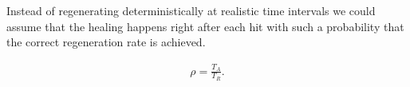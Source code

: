 %
%
%
%

Instead of regenerating deterministically at realistic time intervals we could assume that the healing happens right after each hit with such a probability that the correct regeneration rate is achieved.

\begin{align}\label{eq:regenProbability}
    \rho = \frac{T_A}{T_R}.
\end{align}

